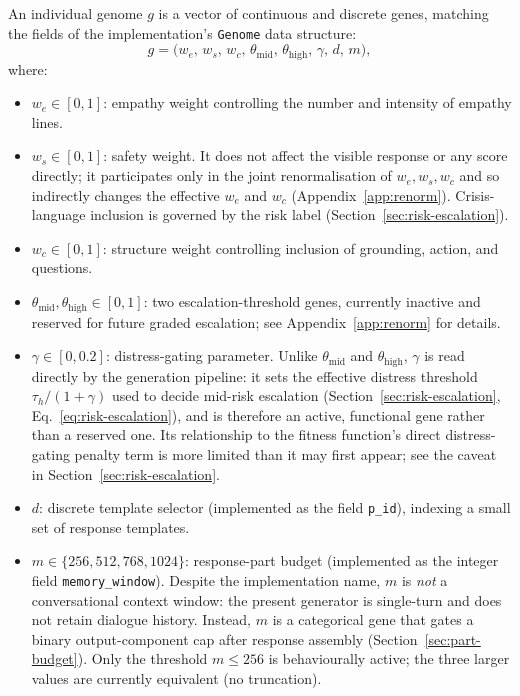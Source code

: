 \documentclass[mathematics,article,submit,xetex,moreauthors]{Definitions/mdpi}
\begin{document}
An individual genome \(g\) is a vector of continuous and discrete genes,
matching the fields of the implementation's \texttt{Genome} data
structure:
\begin{equation}
\label{eq:genome}
  g = \bigl( w_e,\, w_s,\, w_c,\, \theta_{\mathrm{mid}},\,
             \theta_{\mathrm{high}},\, \gamma,\, d,\, m \bigr),
\end{equation}
where:
\begin{itemize}
  \item \(w_e \in [0,1]\): empathy weight controlling the number and intensity
        of empathy lines.
  \item \(w_s \in [0,1]\): safety weight. It does not affect the visible response or any score
  directly; it participates only in the joint renormalisation of
  $w_e,w_s,w_c$ and so indirectly changes the effective $w_e$ and $w_c$
  (Appendix~\ref{app:renorm}). Crisis-language inclusion is governed by the
  risk label (Section~\ref{sec:risk-escalation}).
  \item \(w_c \in [0,1]\): structure weight controlling inclusion of grounding,
        action, and questions.
  \item \(\theta_{\mathrm{mid}}, \theta_{\mathrm{high}} \in [0,1]\): two
        escalation-threshold genes, currently inactive and reserved for
        future graded escalation; see Appendix~\ref{app:renorm}
        for details.
  \item \(\gamma \in [0, 0.2]\): distress-gating parameter. Unlike
        $\theta_{\mathrm{mid}}$ and $\theta_{\mathrm{high}}$, $\gamma$ is
        read directly by the generation pipeline: it
        sets the effective distress threshold $\tau_h/(1+\gamma)$ used to
        decide mid-risk escalation (Section~\ref{sec:risk-escalation},
        Eq.~\eqref{eq:risk-escalation}), and is therefore an active,
        functional gene rather than a reserved one. Its relationship to the
        fitness function's direct distress-gating penalty term is more
        limited than it may first appear; see the caveat in
        Section~\ref{sec:risk-escalation}.
  \item \(d\): discrete template selector (implemented as the field
        \texttt{p\_id}), indexing a small set of response templates.
  \item \(m \in \{256, 512, 768, 1024\}\): response-part budget (implemented as
        the integer field \texttt{memory\_window}). Despite the
        implementation name, $m$ is \emph{not} a conversational context
        window: the present generator is single-turn and does not retain
        dialogue history. Instead, $m$ is a categorical gene that gates a
        binary output-component cap after response assembly
        (Section~\ref{sec:part-budget}). Only the threshold
        $m \le 256$ is behaviourally active; the three larger values are
        currently equivalent (no truncation).
\end{itemize}
\end{document}
